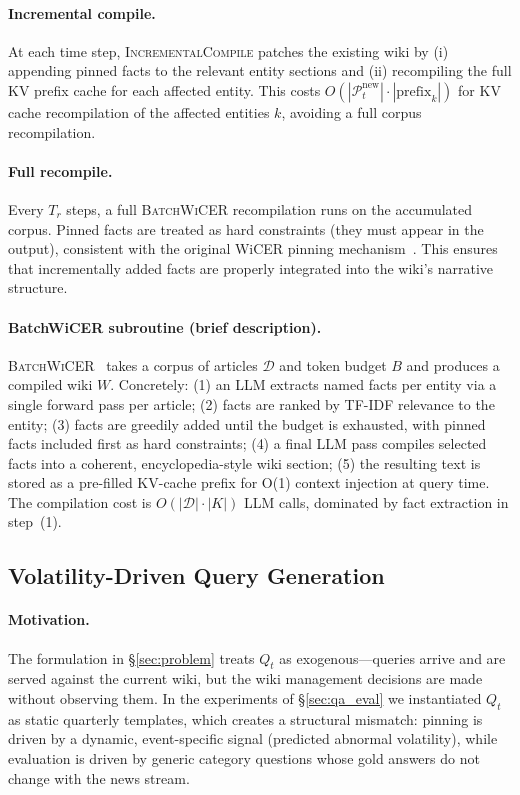 \documentclass{article}
\newcommand{\pt}{\mathcal{P}_t}
\begin{document}
\paragraph{Incremental compile.}
At each time step, \textsc{IncrementalCompile} patches the existing wiki by (i) appending pinned facts to the relevant entity sections and (ii) recompiling the full KV prefix cache for each affected entity.
This costs $O(|\pt^{\text{new}}| \cdot |\text{prefix}_k|)$ for KV cache recompilation of the affected entities $k$, avoiding a full corpus recompilation.

\paragraph{Full recompile.}
Every $T_r$ steps, a full \textsc{BatchWiCER} recompilation runs on the accumulated corpus.
Pinned facts are treated as hard constraints (they must appear in the output), consistent with the original WiCER pinning mechanism~\citep{huerta2026wicer}.
This ensures that incrementally added facts are properly integrated into the wiki's narrative structure.

\paragraph{BatchWiCER subroutine (brief description).}
\textsc{BatchWiCER}~\citep{huerta2026wicer} takes a corpus of articles $\mathcal{D}$ and token budget $B$ and produces a compiled wiki $W$.
Concretely: (1) an LLM extracts named facts per entity via a single forward pass per article; (2) facts are ranked by TF-IDF relevance to the entity; (3) facts are greedily added until the budget is exhausted, with pinned facts included first as hard constraints; (4) a final LLM pass compiles selected facts into a coherent, encyclopedia-style wiki section; (5) the resulting text is stored as a pre-filled KV-cache prefix for O(1) context injection at query time.
The compilation cost is $O(|\mathcal{D}| \cdot |K|)$ LLM calls, dominated by fact extraction in step~(1).

\subsection{Volatility-Driven Query Generation}
\label{sec:queryupdate}

\paragraph{Motivation.}
The formulation in \S\ref{sec:problem} treats $Q_t$ as exogenous---queries arrive and are served against the current wiki, but the wiki management decisions are made without observing them.
In the experiments of \S\ref{sec:qa_eval} we instantiated $Q_t$ as static quarterly templates, which creates a structural mismatch: pinning is driven by a dynamic, event-specific signal (predicted abnormal volatility), while evaluation is driven by generic category questions whose gold answers do not change with the news stream.
\end{document}
